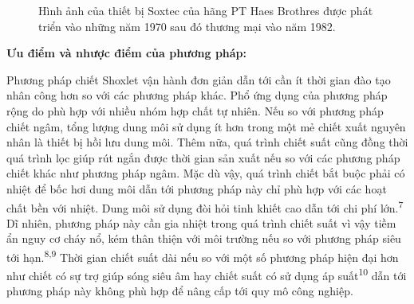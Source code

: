 \documentclass[
  twocolumn,
  landscape]{report}
\begin{document}
\begin{figure}


\caption{\label{fig-soxtec}Hình ảnh của thiết bị Soxtec của hãng PT Haes
Brothres được phát triển vào những năm 1970 sau đó thương mại vào năm
1982.}

\end{figure}%

\textbf{Ưu điểm và nhược điểm của phương pháp:}

Phương pháp chiết Shoxlet vận hành đơn giản dẫn tới cần ít thời gian đào
tạo nhân công hơn so với các phương pháp khác. Phổ ứng dụng của phương
pháp rộng do phù hợp với nhiều nhóm hợp chất tự nhiên. Nếu so với phương
pháp chiết ngâm, tổng lượng dung môi sử dụng ít hơn trong một mẻ chiết
xuất nguyên nhân là thiết bị hồi lưu dung môi. Thêm nữa, quá trình chiết
suất cũng đồng thời quá trình lọc giúp rút ngắn được thời gian sản xuất
nếu so với các phương pháp chiết khác như phương pháp ngâm. Mặc dù vậy,
quá trình chiết bắt buộc phải có nhiệt để bốc hơi dung môi dẫn tới
phương pháp này chỉ phù hợp với các hoạt chất bền với nhiệt. Dung môi sử
dụng đòi hỏi tinh khiết cao dẫn tới chi phí lớn.\textsuperscript{7} Dĩ
nhiên, phương pháp này cần gia nhiệt trong quá trình chiết suất vì vậy
tiềm ẩn nguy cơ cháy nổ, kém thân thiện với môi trường nếu so với phương
pháp siêu tới hạn.\textsuperscript{8,9} Thời gian chiết suất dài nếu so
với một số phương pháp hiện đại hơn như chiết có sự trợ giúp sóng siêu
âm hay chiết suất có sử dụng áp suất\textsuperscript{10} dẫn tới phương
pháp này không phù hợp để nâng cấp tới quy mô công nghiệp.
\end{document}
